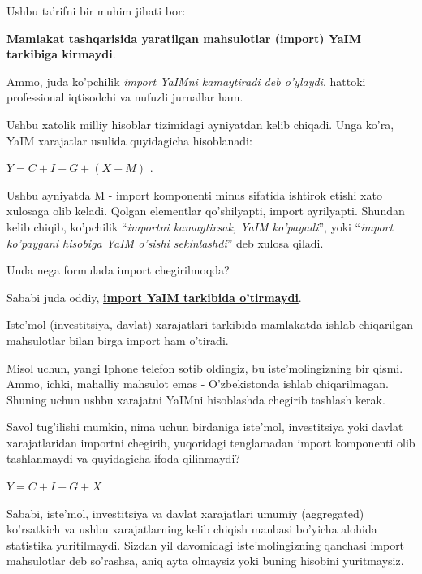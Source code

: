\documentclass[
  letterpaper,
  DIV=11,
  numbers=noendperiod,
  oneside]{scrreprt}
\begin{document}
Ushbu ta'rifni bir muhim jihati bor:

\textbf{Mamlakat tashqarisida yaratilgan mahsulotlar (import) YaIM
tarkibiga kirmaydi}.

Ammo, juda ko'pchilik \emph{import YaIMni kamaytiradi deb o'ylaydi},
hattoki professional iqtisodchi va nufuzli jurnallar ham.

Ushbu xatolik milliy hisoblar tizimidagi ayniyatdan kelib chiqadi. Unga
ko'ra, YaIM xarajatlar usulida quyidagicha hisoblanadi:

\(Y = C + I + G+(X-M)\) .


Ushbu ayniyatda M - import komponenti minus sifatida ishtirok etishi
xato xulosaga olib keladi. Qolgan elementlar qo'shilyapti, import
ayrilyapti. Shundan kelib chiqib, ko'pchilik ``\emph{importni
kamaytirsak, YaIM ko'payadi}'', yoki ``\emph{import ko'paygani hisobiga
YaIM o'sishi sekinlashdi}'' deb xulosa qiladi.

Unda nega formulada import chegirilmoqda?

Sababi juda oddiy, \ul{\textbf{import YaIM tarkibida o'tirmaydi}}.

Iste'mol (investitsiya, davlat) xarajatlari tarkibida mamlakatda ishlab
chiqarilgan mahsulotlar bilan birga import ham o'tiradi.

Misol uchun, yangi Iphone telefon sotib oldingiz, bu iste'molingizning
bir qismi. Ammo, ichki, mahalliy mahsulot emas - O'zbekistonda ishlab
chiqarilmagan. Shuning uchun ushbu xarajatni YaIMni hisoblashda chegirib
tashlash kerak.

Savol tug'ilishi mumkin, nima uchun birdaniga iste'mol, investitsiya
yoki davlat xarajatlaridan importni chegirib, yuqoridagi tenglamadan
import komponenti olib tashlanmaydi va quyidagicha ifoda qilinmaydi?

\(Y = C + I + G+X\)

Sababi, iste'mol, investitsiya va davlat xarajatlari umumiy (aggregated)
ko'rsatkich va ushbu xarajatlarning kelib chiqish manbasi bo'yicha
alohida statistika yuritilmaydi. Sizdan yil davomidagi iste'molingizning
qanchasi import mahsulotlar deb so'rashsa, aniq ayta olmaysiz yoki
buning hisobini yuritmaysiz.
\end{document}
